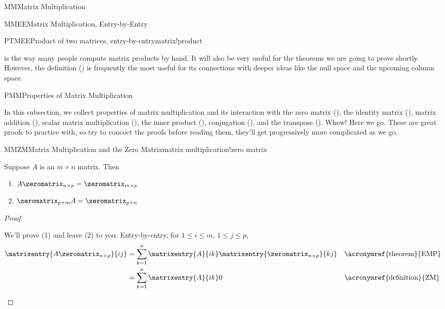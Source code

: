 \begin{subsect}{MM}{Matrix Multiplication}
\begin{subsect}{MMEE}{Matrix Multiplication, Entry-by-Entry}
\begin{example}{PTMEE}{Product of two matrices, entry-by-entry}{matrix!product}
%
\end{example}
%
\begin{para} is the way many people compute matrix products by hand.  It will also be very useful for the theorems we are going to prove shortly.  However, the definition () is frequently the most useful for its connections with deeper ideas like the null space and the upcoming column space.\end{para}
%
%
\end{subsect}
%
\begin{subsect}{PMM}{Properties of Matrix Multiplication}
%
\begin{para}In this subsection, we collect properties of matrix multiplication and its interaction with
the zero matrix (),
the identity matrix (),
matrix addition (),
scalar matrix multiplication (),
the inner product (),
conjugation (),
and
the transpose ().
Whew!  Here we go.  These are great proofs to practice with, so try to concoct the proofs before reading them, they'll get progressively more complicated as we go.\end{para}
%
\begin{theorem}{MMZM}{Matrix Multiplication and the Zero Matrix}{matrix multiplication!zero matrix}
\begin{para}Suppose $A$ is an $m\times n$ matrix.  Then
\begin{enumerate}
\item $A\zeromatrix_{n\times p}=\zeromatrix_{m\times p}$
\item $\zeromatrix_{p\times m}A=\zeromatrix_{p\times n}$
\end{enumerate}
\end{para}
\end{theorem}
%
\begin{proof}
\begin{para}We'll prove (1) and leave (2) to you.  Entry-by-entry, for $1\leq i\leq m$, $1\leq j\leq p$,
%
\begin{align*}
\matrixentry{A\zeromatrix_{n\times p}}{ij}
&=\sum_{k=1}^{n}\matrixentry{A}{ik}\matrixentry{\zeromatrix_{n\times p}}{kj}
&&\text{\acronymref{theorem}{EMP}}\\
%
&=\sum_{k=1}^{n}\matrixentry{A}{ik}0
&&\text{\acronymref{definition}{ZM}}\\

\end{align*}
\end{para}
\end{proof}
\end{subsect}
\end{subsect}
